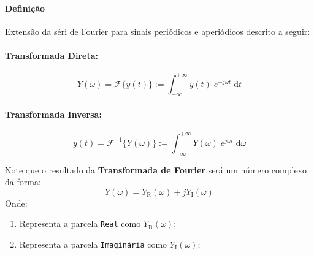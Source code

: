 \documentclass{article}
\begin{document}
                \paragraph{Definição}Extensão da séri de Fourier para sinais periódicos e aperiódicos descrito a seguir:
                    \begin{multicols}{2}
                        \raggedcolumns
                        \paragraph{Transformada Direta:}
                            \begin{equation}
                                \boxed{
                                    Y(\omega) = \mathcal{F} \{ y(t) \} := 
                                    \int_{-\infty}^{+\infty} y(t) \; e^{-j\omega t} \; \text{d}t
                                }
                            \end{equation}
        
                        \columnbreak
        
                        \paragraph{Transformada Inversa:}
                            \begin{equation}
                                \boxed{
                                    y(t) = \mathcal{F}^{-1}\{ Y(\omega) \} := 
                                    \int_{-\infty}^{+\infty} Y(\omega) \; e^{j\omega t} \; \text{d} \omega
                                }
                            \end{equation}
                    \end{multicols}\noindent
                Note que o resultado da \textbf{Transformada de Fourier} será um número complexo da forma:
                    \begin{equation*}
                        \boxed{
                            Y(\omega) = Y_{\text{R}}(\omega) + j Y_{\text{I}}(\omega)
                        }
                    \end{equation*}
                Onde:
                    \begin{enumerate}[noitemsep]
                        \item Representa a parcela \texttt{Real} como $Y_{\text{R}}(\omega)$;

                        \item Representa a parcela \texttt{Imaginária} como $Y_{\text{I}}(\omega)$;
                    \end{enumerate}
\end{document}

